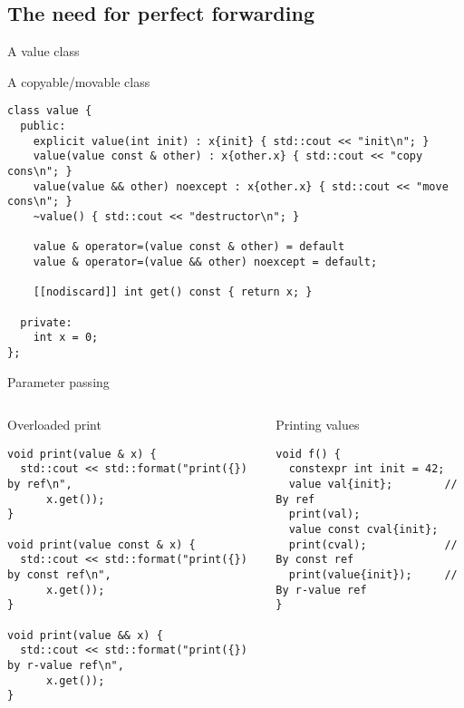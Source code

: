\subsection{The need for perfect forwarding}

\begin{frame}[t,fragile]{A value class}
\begin{block}{A copyable/movable class}
\begin{lstlisting}
class value {
  public:
    explicit value(int init) : x{init} { std::cout << "init\n"; }
    value(value const & other) : x{other.x} { std::cout << "copy cons\n"; }
    value(value && other) noexcept : x{other.x} { std::cout << "move cons\n"; }
    ~value() { std::cout << "destructor\n"; }

    value & operator=(value const & other) = default 
    value & operator=(value && other) noexcept = default;

    [[nodiscard]] int get() const { return x; }

  private:
    int x = 0;
};
\end{lstlisting}
\end{block}
\end{frame}

\begin{frame}[t,fragile]{Parameter passing}

\begin{columns}[T]

\begin{block}{Overloaded print}
\begin{lstlisting}
void print(value & x) {
  std::cout << std::format("print({}) by ref\n", 
      x.get());
}

void print(value const & x) {
  std::cout << std::format("print({}) by const ref\n", 
      x.get());
}

void print(value && x) { 
  std::cout << std::format("print({}) by r-value ref\n", 
      x.get());
}
\end{lstlisting}
\end{block}

\pause
{}
\begin{block}{Printing values}
\begin{lstlisting}
void f() {
  constexpr int init = 42;
  value val{init};        // By ref
  print(val);
  value const cval{init}; 
  print(cval);            // By const ref
  print(value{init});     // By r-value ref
}
\end{lstlisting}
\end{block}

\end{columns}

\end{frame}

